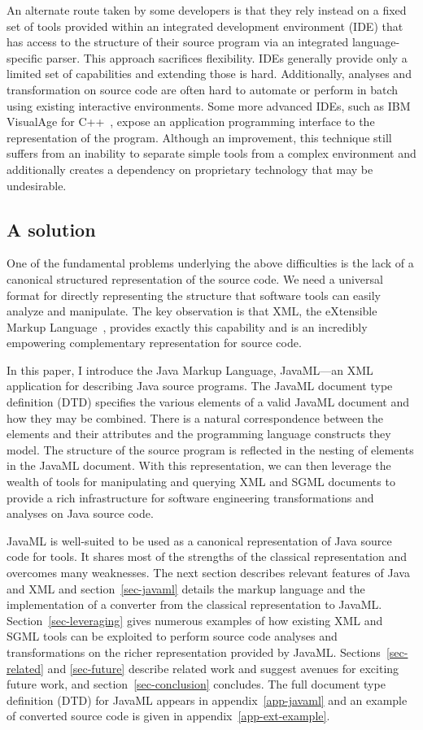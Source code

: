 \documentclass{article}
\begin{document}
An alternate route taken by some developers is that they rely instead on
a fixed set of tools provided within an integrated development
environment (IDE) that has access to the structure of their source
program via an integrated language-specific parser.  This approach
sacrifices flexibility.  IDEs generally provide only a limited set of
capabilities and extending those is hard.  Additionally, analyses and
transformation on source code are often hard to automate or perform in
batch using existing interactive environments.  Some more advanced IDEs,
such as IBM VisualAge for C++~\cite{Soroker97}, expose an application
programming interface to the representation of the program.  Although an
improvement, this technique still suffers from an inability to separate
simple tools from a complex environment and additionally creates a
dependency on proprietary technology that may be undesirable.

\subsection{A solution}

One of the fundamental problems underlying the above difficulties is the
lack of a canonical structured representation of the source code.  We
need a universal format for directly representing the structure that
software tools can easily analyze and manipulate.  The key observation
is that XML, the eXtensible Markup Language~\cite{XML}, provides exactly
this capability and is an incredibly empowering complementary
representation for source code.

In this paper, I introduce the Java Markup Language, JavaML---an XML
application for describing Java source programs.  The JavaML document
type definition (DTD) specifies the various elements of a valid JavaML
document and how they may be combined.  There is a natural
correspondence between the elements and their attributes and the
programming language constructs they model.  The structure of the source
program is reflected in the nesting of elements in the JavaML document.
With this representation, we can then leverage the wealth of tools for
manipulating and querying XML and SGML documents to provide a rich
infrastructure for software engineering transformations and analyses on
Java source code.

JavaML is well-suited to be used as a canonical representation of Java
source code for tools.  It shares most of the strengths of the classical
representation and overcomes many weaknesses.  The next section
describes relevant features of Java and XML and section~\ref{sec-javaml}
details the markup language and the implementation of a converter from
the classical representation to JavaML.  Section~\ref{sec-leveraging}
gives numerous examples of how existing XML and SGML tools can be
exploited to perform source code analyses and transformations on the
richer representation provided by JavaML.  Sections~\ref{sec-related}
and \ref{sec-future} describe related work and suggest avenues for
exciting future work, and section~\ref{sec-conclusion} concludes.  The
full document type definition (DTD) for JavaML appears in
appendix~\ref{app-javaml} and an example of converted source code is
given in appendix~\ref{app-ext-example}.
\end{document}
